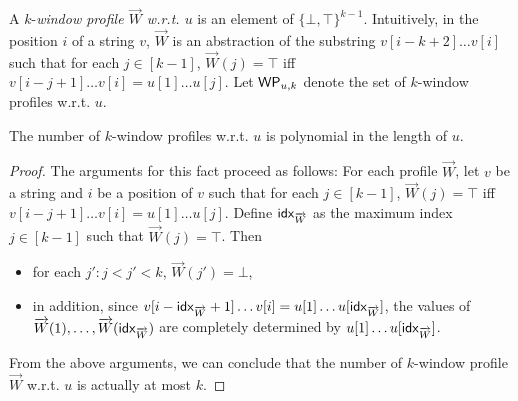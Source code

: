 
\begin{definition}
A $k$-\emph{window profile $\overrightarrow{W}$ w.r.t. $u$} is an element of $\{\bot,\top\}^{k-1}$. Intuitively, in the position $i$ of a string $v$, $\overrightarrow{W}$ is an abstraction of the substring $v[i-k+2] \dots v[i]$ such that for each $j \in [k-1]$, $\overrightarrow{W}(j) = \top$ iff $v[i-j+1] \dots v[i] = u[1] \dots u[j]$. Let $\mathsf{WP}_{u, k}$ denote the set of $k$-window profiles w.r.t. $u$. 
\end{definition}

\begin{proposition}
The number of $k$-window profiles w.r.t. $u$ is polynomial in the length of $u$. 
\end{proposition}
\begin{proof}
The arguments for this fact proceed as follows: For each profile $\overrightarrow{W}$, let $v$ be a string and $i$ be a position of $v$ such that for each $j \in [k-1]$, $\overrightarrow{W}(j) = \top$ iff $v[i-j+1] \dots v[i] = u[1] \dots u[j]$. Define ${\sf idx}_{\overrightarrow{W}}$ as the maximum index $j \in [k-1]$ such that $\overrightarrow{W}(j)=\top$. Then 
\begin{itemize}
	\item for each $j': j < j' < k$, $\overrightarrow{W}(j')=\bot$, 
	\item in addition, since $v[i-{\sf idx}_{\overrightarrow{W}}+1] \dots v[i] = u[1] \dots u[{\sf idx}_{\overrightarrow{W}}]$, the values of $\overrightarrow{W}(1),\dots, \overrightarrow{W}({\sf idx}_{\overrightarrow{W}})$ are completely determined by $u[1] \dots u[{\sf idx}_{\overrightarrow{W}}]$.
\end{itemize}
From the above arguments, we can  conclude that the number of $k$-window profile $\vec{W}$ w.r.t. $u$ is actually at most $k$.
\end{proof}

